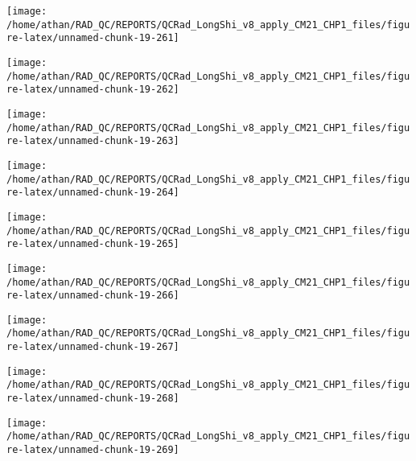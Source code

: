 \documentclass[
  10pt,
  a4paper,oneside]{article}
\begin{document}
\begin{center}\texttt{[image: /home/athan/RAD\_QC/REPORTS/QCRad\_LongShi\_v8\_apply\_CM21\_CHP1\_files/figure-latex/unnamed-chunk-19-261]} \end{center}

\begin{center}\texttt{[image: /home/athan/RAD\_QC/REPORTS/QCRad\_LongShi\_v8\_apply\_CM21\_CHP1\_files/figure-latex/unnamed-chunk-19-262]} \end{center}

\begin{center}\texttt{[image: /home/athan/RAD\_QC/REPORTS/QCRad\_LongShi\_v8\_apply\_CM21\_CHP1\_files/figure-latex/unnamed-chunk-19-263]} \end{center}

\begin{center}\texttt{[image: /home/athan/RAD\_QC/REPORTS/QCRad\_LongShi\_v8\_apply\_CM21\_CHP1\_files/figure-latex/unnamed-chunk-19-264]} \end{center}

\begin{center}\texttt{[image: /home/athan/RAD\_QC/REPORTS/QCRad\_LongShi\_v8\_apply\_CM21\_CHP1\_files/figure-latex/unnamed-chunk-19-265]} \end{center}

\begin{center}\texttt{[image: /home/athan/RAD\_QC/REPORTS/QCRad\_LongShi\_v8\_apply\_CM21\_CHP1\_files/figure-latex/unnamed-chunk-19-266]} \end{center}

\begin{center}\texttt{[image: /home/athan/RAD\_QC/REPORTS/QCRad\_LongShi\_v8\_apply\_CM21\_CHP1\_files/figure-latex/unnamed-chunk-19-267]} \end{center}

\begin{center}\texttt{[image: /home/athan/RAD\_QC/REPORTS/QCRad\_LongShi\_v8\_apply\_CM21\_CHP1\_files/figure-latex/unnamed-chunk-19-268]} \end{center}

\begin{center}\texttt{[image: /home/athan/RAD\_QC/REPORTS/QCRad\_LongShi\_v8\_apply\_CM21\_CHP1\_files/figure-latex/unnamed-chunk-19-269]} \end{center}
\end{document}
